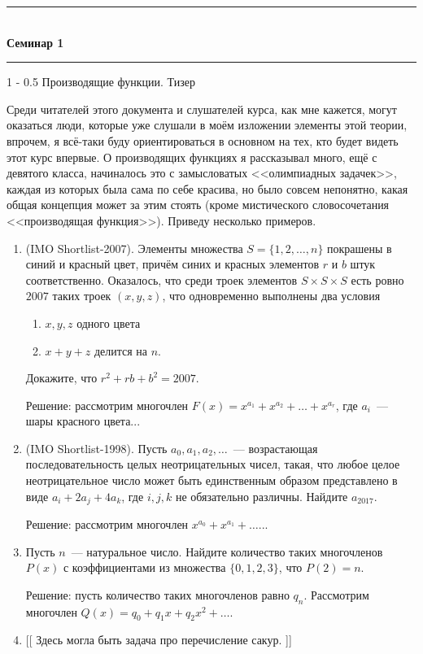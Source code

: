 \documentclass{article}
\makeatletter
\def \topic {Семинар 1}
\theoremstyle{definition}
\renewcommand{\section}{\@startsection
{section}%
{1}%
{\z@}%
{-\baselineskip}%
{0.5\baselineskip}%
{\centering\large\scshape}} %
\makeatother
\begin{document}
\begin{center}

\newcommand{\HRule}{\rule{\linewidth}{0.5mm}}
\HRule \\[0.2cm]
{ \Large \bfseries \topic} %
\HRule

\end{center}

\section{Производящие функции. Тизер}

Среди читателей этого документа и слушателей курса, как мне кажется, могут 
оказаться люди, которые уже слушали в моём изложении элементы этой теории, 
впрочем, я всё-таки буду ориентироваться в основном на тех, кто будет видеть 
этот курс впервые.
О производящих функциях я рассказывал много, ещё с девятого класса, начиналось 
это с замысловатых <<олимпиадных задачек>>, каждая из которых была сама по себе 
красива, но было совсем непонятно, какая общая концепция может за этим стоять 
(кроме мистического словосочетания <<производящая функция>>). Приведу несколько 
примеров.

\begin{enumerate}
	\item (IMO Shortlist-2007). Элементы множества \( S = \{1,2,\ldots, n\} \) 
	покрашены в синий и красный цвет, причём синих и красных элементов \( r \) 
	и \( b \) штук соответственно. Оказалось, что среди троек элементов \( S 
	\times S \times S \) есть ровно \( 2007 \) таких троек \( (x,y,z) \), что 
	одновременно выполнены два условия
	\begin{enumerate}
		\item \( x,y, z \) одного цвета
		\item \( x  + y + z \) делится на \(  n \).
	\end{enumerate}
	Докажите, что \( r^2 + rb + b^2 = 2007 \).
	
	Решение: рассмотрим многочлен \( F(x) = x^{a_1} + x^{a_2} + \ldots + 
	x^{a_r} \), где \( a_i \)~--- шары красного цвета...
	\item (IMO Shortlist-1998). Пусть \( a_0, a_1, a_2, \ldots \)~--- 
	возрастающая последовательность 
	целых неотрицательных чисел, такая, что любое целое неотрицательное число 
	может быть единственным образом представлено в виде \( a_i + 2a_j + 4 a_k 
	\), где \( i,j,k \) не обязательно различны. Найдите \( a_{2017} \).
	
	Решение: рассмотрим многочлен \( x^{a_0} + x^{a_1} + \ldots \)...
	\item Пусть \( n \)~--- натуральное число. Найдите количество таких 
	многочленов \( P(x) \) с коэффициентами из множества \( \{0,1,2,3\} \), что 
	\( P(2) = n \).
	
	Решение: пусть количество таких многочленов равно  \( q_n \). Рассмотрим 
	многочлен \( Q(x) = q_0 + q_1 x + q_2 x^2 + \ldots \).
	\item {}[[ Здесь могла быть задача про перечисление сакур. ]]
\end{enumerate}
\end{document}
